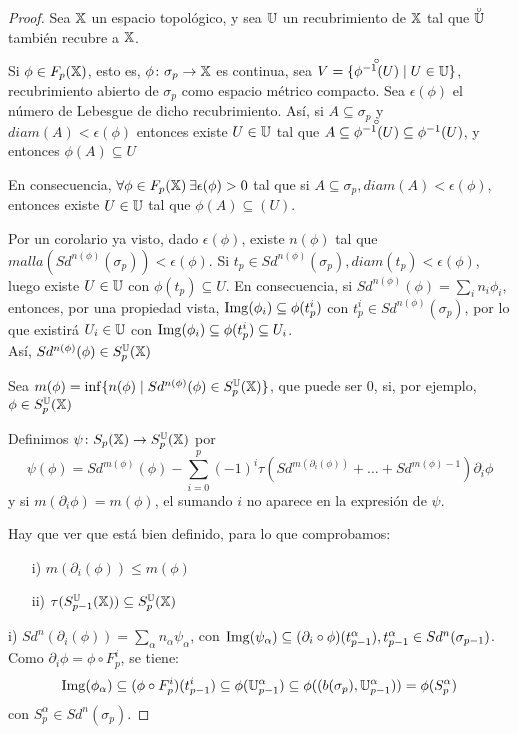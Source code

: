 \begin{proof}
  Sea ${\mathbb X}$ un espacio topológico, y sea ${\mathbb U}$ un recubrimiento de ${\mathbb X}$ tal que $\interior{\U}$ también recubre a ${\mathbb X}$.

  Si $\phi \in F_p({\mathbb X})$, esto es, $\phi \colon \sigma_p \to {\mathbb X}$ es continua, sea $V = \{\interior{\phi^{-1}(U)} \mid U \in \U\}$, recubrimiento
  abierto de $\sigma_p$ como espacio métrico compacto. Sea $\epsilon(\phi)$ el número de Lebesgue de dicho recubrimiento.
  Así, si $A \subseteq \sigma_p$ y $diam(A) < \epsilon(\phi)$ entonces existe $U \in {\mathbb U}$ tal que $A \subseteq \interior{\phi^{-1}(U)} \subseteq
  \phi^{-1}(U)$, y entonces $\phi(A) \subseteq U$

  En consecuencia, $\forall \phi \in F_p({\mathbb X}) \hspace{0.2em} \exists \epsilon(\phi) > 0$ tal que si $A \subseteq \sigma_p, diam(A) < \epsilon(\phi)$,
  entonces existe $U \in {\mathbb U}$ tal que $\phi(A) \subseteq(U)$.

  Por un corolario ya visto, dado $\epsilon(\phi)$, existe $n(\phi)$ tal que ${malla(Sd^{n(\phi)}(\sigma_p)) < \epsilon(\phi)}$.
  Si $t_p \in Sd^{n(\phi)}(\sigma_p), diam(t_p) < \epsilon(\phi)$, luego existe $U \in {\mathbb U}$ con $\phi(t_p) \subseteq U$.
  En consecuencia, si $Sd^{n(\phi)}(\phi) = \sum_i n_i \phi_i$,  entonces, por una propiedad vista, $\operatorname{Img}(\phi_i) \subseteq \phi(t_p^i)$
  con $t_p^i \in Sd^{n(\phi)}(\sigma_p)$, por lo que existirá $U_i \in {\mathbb U}$ con $\operatorname{Img}(\phi_i) \subseteq \phi(t_p^i) \subseteq U_i$. \\
  Así, $Sd^{n(\phi)}(\phi) \in S_p^{\mathbb U}({\mathbb X})$

  Sea $m(\phi) = \inf\{n(\phi) \mid Sd^{n(\phi)}(\phi) \in S_p^{\mathbb U}({\mathbb X})\}$, que puede ser $0$, si, por ejemplo, $\phi \in S_p^{\mathbb U}({\mathbb X})$

  Definimos $\psi \colon S_p({\mathbb X}) \to S_p^{\mathbb U}({\mathbb X})$ por
  \[\psi(\phi) = Sd^{m(\phi)}(\phi) - \sum\limits_{i = 0}^p (-1)^i \tau(Sd^{m(\partial_i(\phi))} + \dots + Sd^{m(\phi) - 1}) \partial_i \phi \]
  y si $m(\partial_i \phi) = m (\phi)$, el sumando $i$ no aparece en la expresión de $\psi$.

  Hay que ver que está bien definido, para lo que comprobamos:
  \begin{itemize}
    \item[i)] $m(\partial_i(\phi)) \leq m(\phi)$
    \item[ii)] $\tau(S_{p-1}^{\mathbb U}({\mathbb X})) \subseteq S_p^{\mathbb U}({\mathbb X})$
  \end{itemize}

  i) $Sd^n(\partial_i(\phi)) = \sum_\alpha n_\alpha \psi_\alpha$, con $\operatorname{Img}(\psi_\alpha) \subseteq (\partial_i \circ \phi)(t_{p-1}^\alpha), t_{p-1}^\alpha \in Sd^n(\sigma_{p-1})$. \\
  Como $\partial_i \phi = \phi \circ F_p^i$, se tiene:
  \[ \operatorname{Img}(\phi_\alpha) \subseteq (\phi \circ F_p^i)(t_{p-1}^i) \subseteq \phi({\mathbb U}_{p-1}^\alpha) \subseteq \phi((b(\sigma_p), {\mathbb U}_ {p-1}^\alpha)) = \phi(S_p^\alpha)\]
  con $S_p^\alpha \in Sd^n(\sigma_p)$.


\end{proof}
